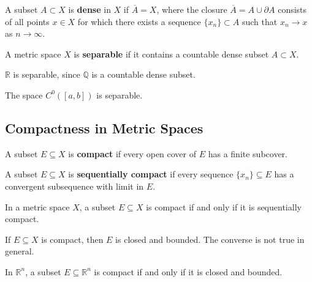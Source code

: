 \begin{definition}
A subset \(A \subset X\) is \textbf{dense} in \(X\) if \(\overline{A} = X\), where the closure \(\overline{A} = A \cup \partial A\) consists of all points \(x \in X\) for which there exists a sequence \(\{x_n\} \subset A\) such that \(x_n \to x\) as \(n \to \infty\).
\end{definition}

\begin{definition}
A metric space \(X\) is \textbf{separable} if it contains a countable dense subset \(A \subset X\).
\end{definition}

\begin{example}
\(\mathbb{R}\) is separable, since \(\mathbb{Q}\) is a countable dense subset.
\end{example}

\begin{theorem}
The space \(C^0([a,b])\) is separable.
\end{theorem}

\subsection{Compactness in Metric Spaces}

\begin{definition}
A subset \(E \subseteq X\) is \textbf{compact} if every open cover of \(E\) has a finite subcover.
\end{definition}

\begin{definition}
A subset \(E \subseteq X\) is \textbf{sequentially compact} if every sequence \(\{x_n\} \subseteq E\) has a convergent subsequence with limit in \(E\).
\end{definition}

\begin{theorem}
In a metric space \(X\), a subset \(E \subseteq X\) is compact if and only if it is sequentially compact.
\end{theorem}

\begin{proposition}
If \(E \subseteq X\) is compact, then \(E\) is closed and bounded. The converse is not true in general.
\end{proposition}

\begin{remark}
In \(\mathbb{R}^n\), a subset \(E \subseteq \mathbb{R}^n\) is compact if and only if it is closed and bounded.
\end{remark}

